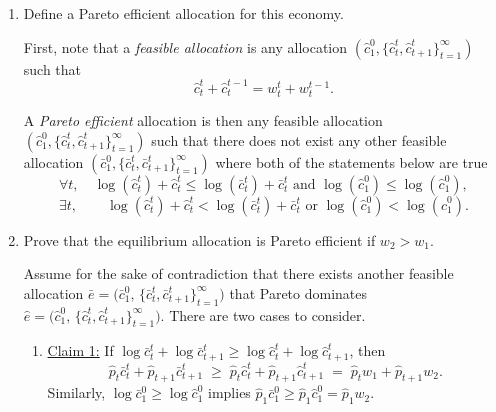 \documentclass[11pt,english]{article}
\begin{document}
\begin{enumerate}
\begin{solution}
\begin{itemize}
\item $\bar{r}_t = \frac{\hat{p}_{t}}{\hat{p}+{t+1}} - 1$.

\item $\bar{b}_{t+1} = w_t^t - \bar{c}_t^t$.
\end{itemize}
    \end{solution}
 
    \item[c.] Define a Pareto efficient allocation for this economy.
    \begin{solution}
 First, note that a \textit{feasible allocation} is any allocation $\left(\hat{c}_1^0, \{\hat{c}_t^t, \hat{c}_{t+1}^t\}_{t=1}^\infty\right)$ such that $$\hat{c}_t^t + \hat{c}_t^{t-1} = w_t^t + w_{t}^{t-1}.$$

A \textit{Pareto efficient} allocation is then any feasible allocation $\left(\hat{c}_1^0, \{\hat{c}_t^t, \hat{c}_{t+1}^t\}_{t=1}^\infty\right)$ such that there does not exist any other feasible allocation $\left(\bar{c}_1^0, \{\bar{c}_t^t, \bar{c}_{t+1}^t\}_{t=1}^\infty\right)$ where both of the statements below are true$$\forall t,\quad \log(\hat{c}_t^t) + \hat{c}_t^t \leq \log(\bar{c}_t^t) + \bar{c}_t^t\text{ and } \log(\hat{c}_1^0) \leq \log(\hat{c}_1^0),$$
$$\exists t,\quad \quad \log(\hat{c}_t^t) + \hat{c}_t^t < \log(\bar{c}_t^t) + \bar{c}_t^t\text{ or } \log(\hat{c}_1^0) < \log(\hat{c}_1^0).$$

    \end{solution}
 
    \item[d.] Prove that the equilibrium allocation is Pareto efficient if $w_2
        > w_1$.
    \begin{solution}Assume for the sake of contradiction that there exists another feasible allocation
$\bar{e} = \bigl(\bar{c}_1^0,\, \{\bar{c}_t^t, \bar{c}_{t+1}^t\}_{t=1}^{\infty}\bigr)$
that Pareto dominates $\hat{e} =  \bigl(\hat{c}_1^0,\, \{\hat{c}_t^t, \hat{c}_{t+1}^t\}_{t=1}^{\infty}\bigr)$.
There are two cases to consider.
 
\begin{enumerate}
\item \underline{Claim 1:} If $\log \bar{c}_t^t + \log \bar{c}_{t+1}^t \geq \log \hat{c}_t^t + \log \hat{c}_{t+1}^t$, then
\[
  \hat{p}_t \bar{c}_t^t + \hat{p}_{t+1} \bar{c}_{t+1}^t
  \;\geq\;
  \hat{p}_t \hat{c}_t^t + \hat{p}_{t+1} \hat{c}_{t+1}^t
  \;=\; \hat{p}_t w_1 + \hat{p}_{t+1} w_2.
\]
Similarly, $\log \bar{c}_1^0 \geq \log \hat{c}_1^0$ implies $\hat{p}_1 \bar{c}_1^0 \geq \hat{p}_1 \hat{c}_1^0 = \hat{p}_1 w_2$.
 

\end{enumerate}
\end{solution}
\end{enumerate}
\end{document}
